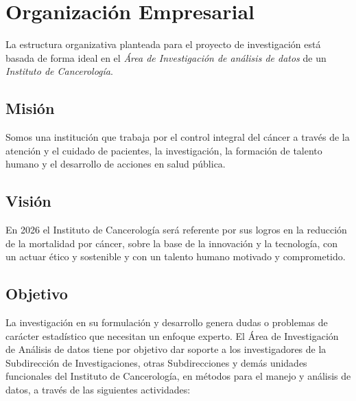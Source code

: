 \chapter{Organización Empresarial}
La estructura organizativa planteada para el proyecto de investigación está basada de forma ideal en el \textit{Área de Investigación de análisis de datos} de un \textit{Instituto de Cancerología}. 

\section{Misión}
Somos una institución que trabaja por el control integral del cáncer a través de la atención y el cuidado de pacientes, la investigación, la formación de talento humano y el desarrollo de acciones en salud pública.

\section{Visión}
En 2026 el Instituto de Cancerología será referente por sus logros en la reducción de la mortalidad por cáncer, sobre la base de la innovación y la tecnología, con un actuar ético y sostenible y con un talento humano motivado y
comprometido.
\newpage

\section{Objetivo}
La investigación en su formulación y desarrollo genera dudas o problemas de carácter estadístico que necesitan un enfoque experto. El  Área de Investigación de Análisis de datos tiene por objetivo dar soporte a los investigadores de la Subdirección de Investigaciones, otras Subdirecciones y demás unidades funcionales del Instituto de Cancerología, en métodos para el manejo y análisis de datos, a través de las siguientes actividades:

